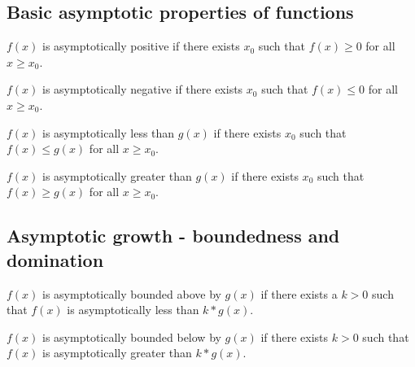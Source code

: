 \subsection{Basic asymptotic properties of functions}


\begin{definition}
    \label{def:asymp_pos}
    \leanok
    $f(x)$ is asymptotically positive if there exists $x_0$ such that $f(x) \ge 0$
    for all $x \ge x_0$.

\end{definition}

\begin{definition}
    \label{def:asymp_neg}
    \leanok
    $f(x)$ is asymptotically negative if there exists $x_0$ such that $f(x) \le 0$
    for all $x \ge x_0$.

\end{definition}

\begin{definition}
    \label{def:asymp_le}
    \leanok
    $f(x)$ is asymptotically less than $g(x)$ if there exists $x_0$ such that
    $f(x) \le g(x)$ for all $x \ge x_0$.

\end{definition}

\begin{definition}
    \label{def:asymp_ge}
    \leanok
    $f(x)$ is asymptotically greater than $g(x)$ if there exists $x_0$ such that
    $f(x) \ge g(x)$ for all $x \ge x_0$.

\end{definition}


\subsection{Asymptotic growth - boundedness and domination}

\begin{definition}
    \label{def:asymp_bounded_above}
    \leanok
    $f(x)$ is asymptotically bounded above by $g(x)$ if there exists a $k > 0$ 
    such that $f(x)$ is asymptotically less than $k*g(x)$.
\end{definition}

\begin{definition}
    \label{def:asymp_bounded_below}
    \leanok
    $f(x)$ is asymptotically bounded below by $g(x)$ if there exists $k > 0$ 
    such that $f(x)$ is asymptotically greater than $k*g(x)$.
\end{definition}

